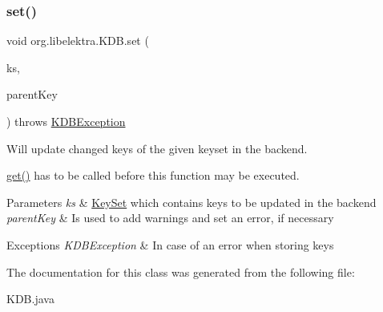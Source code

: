 \subsubsection{\texorpdfstring{set()}{set()}}
{\footnotesize\ttfamily void org.\+libelektra.\+K\+D\+B.\+set (\begin{DoxyParamCaption}\item[{final \hyperlink{classorg_1_1libelektra_1_1KeySet}{Key\+Set}}]{ks,  }\item[{final \hyperlink{classorg_1_1libelektra_1_1Key}{Key}}]{parent\+Key }\end{DoxyParamCaption}) throws \hyperlink{classorg_1_1libelektra_1_1exception_1_1KDBException}{K\+D\+B\+Exception}\hspace{0.3cm}{\ttfamily [inline]}}



Will update changed keys of the given keyset in the backend. 

\hyperlink{classorg_1_1libelektra_1_1KDB_a600abc786bde91a3122bd96be991a3d5}{get()} has to be called before this function may be executed.


\begin{DoxyParams}{Parameters}
{\em ks} & \hyperlink{classorg_1_1libelektra_1_1KeySet}{Key\+Set} which contains keys to be updated in the backend \\
\hline
{\em parent\+Key} & Is used to add warnings and set an error, if necessary \\
\hline
\end{DoxyParams}

\begin{DoxyExceptions}{Exceptions}
{\em K\+D\+B\+Exception} & In case of an error when storing keys \\
\hline
\end{DoxyExceptions}


The documentation for this class was generated from the following file\+:\begin{DoxyCompactItemize}
\item 
K\+D\+B.\+java\end{DoxyCompactItemize}
